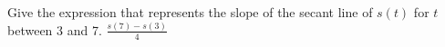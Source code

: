 {Give the expression that represents the slope of the secant line of $s(t)$ for $t$ between 3 and 7.}
{$\frac{s(7)-s(3)}{4}$}